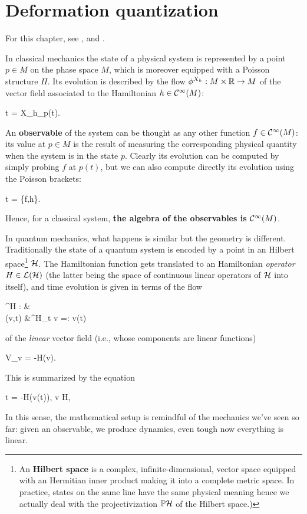 \chapter{Deformation quantization}
For this chapter, see \cite{cattaneo2004formality}, \cite{kontsevich2003deformation} and \cite{gerstenhaber1964deformation}.

In classical mechanics the state of a physical system is represented by a point $p \in M$ on the phase space $M$, which is moreover equipped with a Poisson structure $\Pi$. Its evolution is described by the flow $\phi^{X_h}: M \times \mathbb{R} \to M$ of the vector field associated to the Hamiltonian $h \in \mathcal{C}^\infty(M)$:
\begin{eqalign}
	t = X_h\vert_{p(t)}.
\end{eqalign}
An \textbf{observable} of the system can be thought as any other function $f \in \mathcal{C}^\infty(M)$: its value at $p \in M$ is the result of measuring the corresponding physical quantity when the system is in the state $p$. Clearly its evolution can be computed by simply probing $f$ at $p(t)$, but we can also compute directly its evolution using the Poisson brackets:
\begin{eqalign}
\label{eq:classical_evolution_eq}
	t = \{f,h\}.
\end{eqalign}
Hence, for a classical system, \textbf{the algebra of the observables is $\mathcal{C}^\infty(M)$}.

In quantum mechanics, what happens is similar but the geometry is different. Traditionally the state of a quantum system is encoded by a point in an Hilbert space\footnote{An \textbf{Hilbert space} is a complex, infinite-dimensional, vector space equipped with an Hermitian inner product making it into a complete metric space. In practice, states on the same line have the same physical meaning hence we actually deal with the projectivization $\mathbb{P} \mathcal{H}$ of the Hilbert space.)} $\mathcal{H}$. The Hamiltonian function gets translated to an Hamiltonian \emph{operator} $H \in \mathcal{L}(\mathcal{H})$ (the latter being the space of continuous linear operators of $\mathcal{H}$ into itself), and time evolution is given in terms of the flow
\begin{eqalign}
	\phi^H : \hilbert \times \R &\longto \hilbert\\
	(v,t) &\longmapsto \phi^H_t v =: v(t)
\end{eqalign}
of the \emph{linear} vector field (i.e., whose components are linear functions)
\begin{eqalign}
	V\vert_v = -\planck H(v).
\end{eqalign}
This is summarized by the equation
\begin{eqalign}
\label{eq:state_evolution}
	t = -\planck H(v(t)), \quad \forall v \in H,
\end{eqalign}
In this sense, the mathematical setup is remindful of the mechanics we've seen so far: given an observable, we produce dynamics, even tough now everything is linear.

